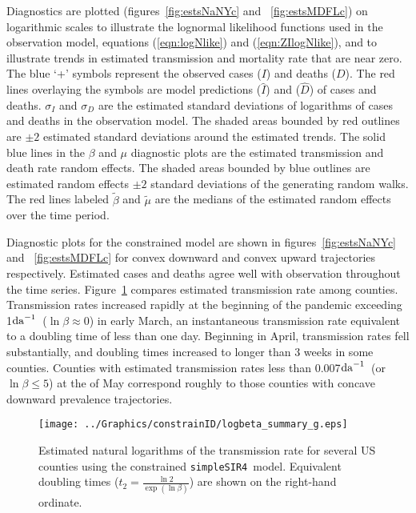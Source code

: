 \documentclass[12pt,letterpaper]{article}
\newcommand\perda{$\rm{da}^{-1}$}
\newcommand\SSm{{\tt simpleSIR4}}
\begin{document}
Diagnostics are plotted
(figures~\ref{fig:estsNaNYc} and~ \ref{fig:estsMDFLc})
on logarithmic scales to illustrate the
lognormal likelihood functions used in the observation model,
equations (\ref{eqn:logNlike}) and (\ref{eqn:ZIlogNlike}), and to
illustrate trends in estimated transmission and mortality rate that
are near zero.
\label{pp:diagexpl} 
The blue `+' symbols represent the observed cases ($I$) and deaths ($D$).
The red lines overlaying the symbols are model predictions ($\widehat{I}$)
and ($\widehat{D}$) of cases and deaths. 
$\sigma_I$ and $\sigma_D$ are the estimated standard deviations of
logarithms of cases and deaths in the observation model.
The shaded areas bounded by red outlines are 
$\pm 2$ estimated standard deviations around the estimated trends.
The solid blue lines in the $\beta$ and $\mu$ diagnostic plots are the estimated
transmission and death rate random effects.
The shaded areas bounded by blue outlines are
estimated random effects $\pm 2$ standard deviations of the generating
random walks.
The red lines labeled $\tilde{\beta}$ and $\tilde{\mu}$ are the
medians of the estimated random effects over the time period.

Diagnostic plots for the constrained model are shown in
figures~\ref{fig:estsNaNYc} and~ \ref{fig:estsMDFLc}
for convex downward and convex upward trajectories
respectively.
Estimated cases and deaths agree well with observation throughout the
time series.
Figure~\ref{fig:xrates} compares estimated transmission rate among
counties.
Transmission rates increased rapidly at the beginning of the pandemic
exceeding  1\perda\ ($\ln \beta \approx 0$) in early March, 
an instantaneous transmission rate
equivalent to a doubling time of less than one day.
Beginning in April, transmission rates fell substantially, and doubling times
increased to longer than 3 weeks in some counties.
Counties with estimated transmission rates less than 0.007\perda\ 
(or $\ln \beta \le 5$)
at the of May
correspond roughly to those counties with concave downward prevalence
trajectories.


\begin{figure}
\begin{center}
\texttt{[image: ../Graphics/constrainID/logbeta\_summary\_g.eps]}\\
\end{center}
\caption{\label{fig:xrates}
Estimated natural logarithms of the transmission rate for several US
counties using the constrained \SSm\ model.
Equivalent doubling times ($t_2 = \frac{\ln 2}{\exp(\ln \beta)}$)
are shown on the right-hand ordinate.
}
\end{figure}
\end{document}
